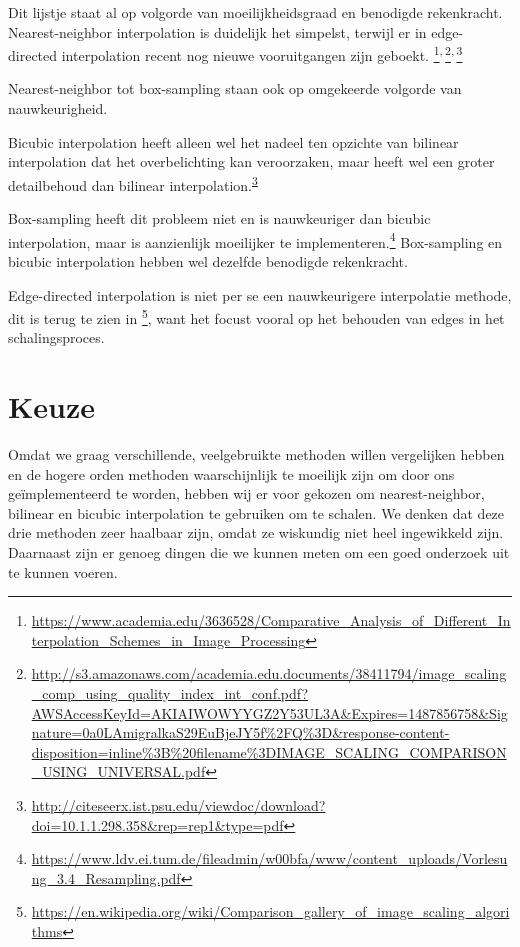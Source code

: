 \documentclass[a4paper]{article}
\begin{document}
Dit lijstje staat al op volgorde van moeilijkheidsgraad en benodigde
rekenkracht. Nearest-neighbor interpolation is duidelijk het simpelst,
terwijl er in edge-directed interpolation recent nog nieuwe
vooruitgangen zijn geboekt. \footnote{\url{https://www.academia.edu/3636528/Comparative\_Analysis\_of\_Different\_Interpolation\_Schemes\_in\_Image\_Processing}}\textsuperscript{,}\,\footnote{\url{http://s3.amazonaws.com/academia.edu.documents/38411794/image\_scaling\_comp\_using\_quality\_index\_int\_conf.pdf?AWSAccessKeyId=AKIAIWOWYYGZ2Y53UL3A\&Expires=1487856758\&Signature=0a0LAmigralkaS29EuBjeJY5f\%2FQ\%3D\&response-content-disposition=inline\%3B\%20filename\%3DIMAGE\_SCALING\_COMPARISON\_USING\_UNIVERSAL.pdf}}\textsuperscript{,}\,\footnote{\url{http://citeseerx.ist.psu.edu/viewdoc/download?doi=10.1.1.298.358\&rep=rep1\&type=pdf}\label{org36c7428}}

Nearest-neighbor tot box-sampling staan ook op omgekeerde volgorde van
nauwkeurigheid.

Bicubic interpolation heeft alleen wel het nadeel ten opzichte van
bilinear interpolation dat het overbelichting kan veroorzaken, maar
heeft wel een groter detailbehoud dan bilinear interpolation.\textsuperscript{\ref{org36c7428}}

Box-sampling heeft dit probleem niet en is nauwkeuriger
dan bicubic interpolation, maar is aanzienlijk moeilijker te
implementeren.\footnote{\url{https://www.ldv.ei.tum.de/fileadmin/w00bfa/www/content\_uploads/Vorlesung\_3.4\_Resampling.pdf}}
Box-sampling en bicubic interpolation hebben wel dezelfde benodigde
rekenkracht.

Edge-directed interpolation is niet per se een nauwkeurigere
interpolatie methode, dit is terug te zien in \footnote{\url{https://en.wikipedia.org/wiki/Comparison\_gallery\_of\_image\_scaling\_algorithms}}, want het focust
vooral op het behouden van edges in het schalingsproces.

\section{Keuze}
\label{sec:orgeff1d0a}
Omdat we graag verschillende, veelgebruikte methoden willen vergelijken hebben
en de hogere orden methoden waarschijnlijk te moeilijk zijn om door ons geïmplementeerd
te worden, hebben wij er voor gekozen om nearest-neighbor, bilinear en bicubic
interpolation te gebruiken om te schalen. We denken dat deze drie methoden zeer
haalbaar zijn, omdat ze wiskundig niet heel ingewikkeld zijn. Daarnaast zijn er
genoeg dingen die we kunnen meten om een goed onderzoek uit te kunnen voeren.
\end{document}
